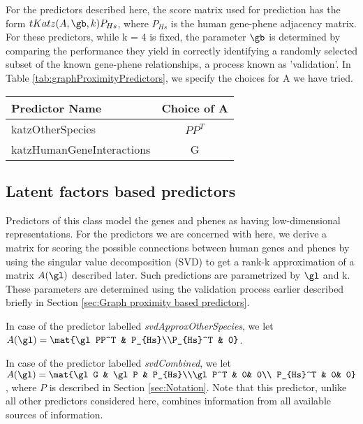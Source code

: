 \documentclass{article}
\begin{document}
For the predictors described here, the score matrix used for prediction has the form $tKatz(A, \gb, k)P_{Hs}$, where $P_{Hs}$ is the human gene-phene adjacency matrix. For these predictors, while k = 4 is fixed, the parameter $\gb$ is determined by comparing the performance they yield in correctly identifying a randomly selected subset of the known gene-phene relationships, a process known as 'validation'. In Table \ref{tab:graphProximityPredictors}, we specify the choices for A we have tried.

\begin{table*}[h]
\centering
\begin{tabular}{| p{5 cm} |c |} \hline
Predictor Name& Choice of A \\ \hline \hline
katzOtherSpecies& $PP^T$\\ \hline
katzHumanGeneInteractions& G \\ \hline
\end{tabular}
\caption{Some graph proximity predictors. Refer Section \ref{sec:Notation} for notation.}
\label{tab:graphProximityPredictors}
\end{table*}

\subsection{Latent factors based predictors}
Predictors of this class model the genes and phenes as having low-dimensional representations. For the predictors we are concerned with here, we derive a matrix for scoring the possible connections between human genes and phenes by using the singular value decomposition (SVD) to get a rank-k approximation of a matrix $A(\gl)$ described later. Such predictions are parametrized by $\gl$ and k. These parameters are determined using the validation process earlier described briefly in Section \ref{sec:Graph proximity based predictors}.

In case of the predictor labelled \textit{svdApproxOtherSpecies}, we let $A(\gl) = \mat{\gl PP^T & P_{Hs}\\P_{Hs}^T & 0}$.

In case of the predictor labelled \textit{svdCombined}, we let $A(\gl) = \mat{\gl G & \gl P & P_{Hs}\\\gl P^T & 0& 0\\ P_{Hs}^T & 0& 0}$, 
where $P$ is described in Section \ref{sec:Notation}. Note that this predictor, unlike all other predictors considered here, combines information from all available sources of information.
\end{document}
